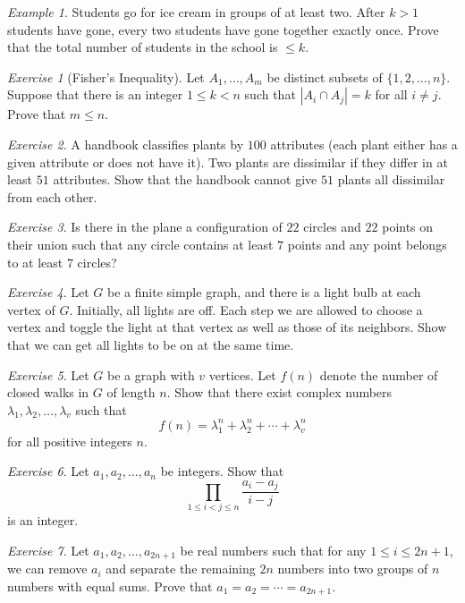 \documentclass{article}
\theoremstyle{definition}
\theoremstyle{remark}
\newtheorem{exercise}{Exercise}
\newtheorem{example}{Example}
\newcommand{\leqs}{\leqslant}
\begin{document}
\begin{example}
Students go for ice cream in groups of at least two. After $k>1$ students have gone, every two students have gone together exactly once. Prove that the total number of students in the school is $\leqs k$.
\end{example}

\begin{exercise}[Fisher's Inequality]
Let $A_1,\dots,A_m$ be distinct subsets of $\{1,2,\dots,n\}$. Suppose that there is an integer $1\leqs k< n$ such that $|A_i\cap A_j|=k$ for all $i\neq j$. Prove that $m\leqs n$.
\end{exercise}

\begin{exercise}
A handbook classifies plants by $100$ attributes (each plant either has a given attribute or does not have it). Two plants are dissimilar if they differ in at least $51$ attributes. Show that the handbook cannot give $51$ plants all dissimilar from each other.
\end{exercise}

\begin{exercise}
Is there in the plane a configuration of $22$ circles and $22$ points on their union such that any circle contains at least $7$ points and any point belongs to at least $7$ circles?
\end{exercise}

\begin{exercise}
Let $G$ be a finite simple graph, and there is a light bulb at each vertex of $G$. Initially, all lights are off. Each step we are allowed to choose a vertex and toggle the light at that vertex as well as those of its neighbors. Show that we can get all lights to be on at the same time.
\end{exercise}

\begin{exercise}
 Let $G$ be a graph with $v$ vertices. Let $f(n)$ denote the number of closed walks in $G$ of length $n$. Show that there exist complex numbers $\lambda_1,\lambda_2,\dots,\lambda_v$ such that
\[f(n)=\lambda_1^n+\lambda_2^n+\cdots +\lambda_v^n\] for all positive integers $n$. 
\end{exercise}

\begin{exercise}
Let $a_1,a_2,\dots,a_n$ be integers. Show that
\[\prod_{1\leqs i<j\leqs n}\frac{a_i-a_j}{i-j}\] is an integer.
\end{exercise}

\begin{exercise}
Let $a_1,a_2,\dots,a_{2n+1}$ be real numbers such that for any $1\leqs i \leqs 2n+1$, we can remove $a_i$ and separate the remaining $2n$ numbers into two groups of $n$ numbers with equal sums. Prove that $a_1=a_2=\cdots=a_{2n+1}$.
\end{exercise}
\end{document}
